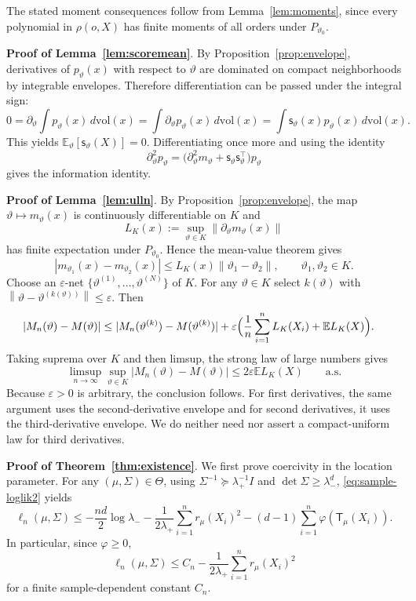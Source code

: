 \documentclass[11pt]{article}
\newcommand{\E}{\mathbb{E}}
\newcommand{\Id}{I}
\newcommand{\norm}[1]{\left\lVert #1\right\rVert}
\newcommand{\psiwrap}{\varphi}
\newcommand{\score}{\mathsf{s}}
\newcommand{\T}{\mathsf{T}}
\begin{document}
The stated moment consequences follow from Lemma~\ref{lem:moments}, since every polynomial in $\rho(o,X)$ has finite moments of all orders under $P_{\vartheta_0}$.



\medskip
\noindent \textbf{Proof of Lemma~\ref{lem:scoremean}}. By Proposition~\ref{prop:envelope},  derivatives of $p_\vartheta(x)$ with respect to $\vartheta$ are dominated on compact neighborhoods by integrable envelopes. Therefore differentiation can be passed under the integral sign:
\[
0=\partial_\vartheta \int p_\vartheta(x)\,d\mathrm{vol}(x)=\int \partial_\vartheta p_\vartheta(x)\,d\mathrm{vol}(x)
=\int \score_\vartheta(x)p_\vartheta(x)\,d\mathrm{vol}(x).
\]
This yields $\E_\vartheta[\score_\vartheta(X)]=0$. Differentiating once more and using the identity
\[
\partial_\vartheta^2 p_\vartheta
=
\bigl(\partial_\vartheta^2 m_\vartheta+\score_\vartheta\score_\vartheta^\top\bigr)p_\vartheta
\]
gives the information identity.


\medskip
\noindent \textbf{Proof of Lemma~\ref{lem:ulln}}. By Proposition~\ref{prop:envelope}, the map $\vartheta\mapsto m_\vartheta(x)$ is continuously differentiable on $K$ and
\[
L_K(x):=\sup_{\vartheta\in K}\norm{\partial_\vartheta m_\vartheta(x)}
\]
has finite expectation under $P_{\vartheta_0}$. Hence the mean-value theorem gives
\[
|m_{\vartheta_1}(x)-m_{\vartheta_2}(x)|\le L_K(x)\norm{\vartheta_1-\vartheta_2},
\qquad \vartheta_1,\vartheta_2\in K.
\]
Choose an $\varepsilon$-net $\{\vartheta^{(1)},\dots,\vartheta^{(N)}\}$ of $K$. For any $\vartheta\in K$ select $k(\vartheta)$ with $\norm{\vartheta-\vartheta^{(k(\vartheta))}}\le\varepsilon$. Then
\begin{align*}
|M_n(\vartheta)-M(\vartheta)|
&\le |M_n(\vartheta^{(k)})-M(\vartheta^{(k)})|
+ \varepsilon\Bigl(\frac1n\sum_{i=1}^n L_K(X_i)+\E L_K(X)\Bigr).
\end{align*}
Taking suprema over $K$ and then limsup, the strong law of large numbers gives
\[
\limsup_{n\to\infty}\sup_{\vartheta\in K}|M_n(\vartheta)-M(\vartheta)|
\le 2\varepsilon \E L_K(X)
\qquad \text{a.s.}
\]
Because $\varepsilon>0$ is arbitrary, the conclusion follows. For first derivatives, the same argument uses the second-derivative envelope and for second derivatives, it uses the third-derivative envelope. We do neither need nor assert a compact-uniform law for third derivatives.

\medskip 
\noindent \textbf{Proof of Theorem~\ref{thm:existence}}. We first prove coercivity in the location parameter. For any $(\mu,\Sigma)\in\Theta$, using $\Sigma^{-1}\succeq \lambda_+^{-1}\Id$ and $\det \Sigma\ge \lambda_-^d$, \eqref{eq:sample-loglik2} yields
\begin{equation}
\label{eq:coercive-upper}
\ell_n(\mu,\Sigma)
\le
-\frac{nd}{2}\log\lambda_-
-\frac{1}{2\lambda_+}\sum_{i=1}^n r_\mu(X_i)^2
-(d-1)\sum_{i=1}^n \psiwrap(\T_\mu(X_i)).
\end{equation}
In particular, since $\psiwrap\ge 0$,
\[
\ell_n(\mu,\Sigma)
\le C_n - \frac{1}{2\lambda_+}\sum_{i=1}^n r_\mu(X_i)^2
\]
for a finite sample-dependent constant $C_n$.
\end{document}
